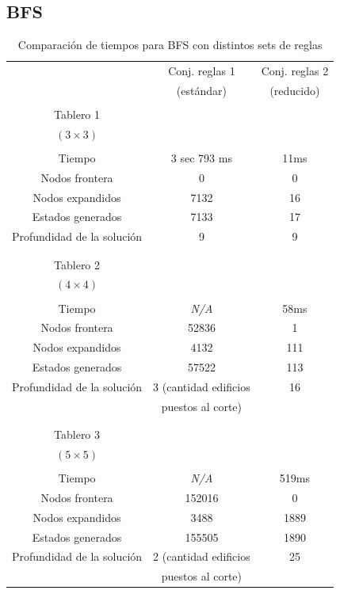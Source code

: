 \documentclass[%
    final,
    reprint,
    notitlepage,
    narroweqnarray,
    inline,
    twoside,
    invited
    ]{ieee}
\begin{document}
\clearpage

\subsection{BFS}

\begin{table}[H]
\begin{center}
\begin{tabular}{|c|c|c|}
\hline
 & Conj. reglas 1 &  Conj. reglas 2\\
 & (estándar) &  (reducido)\\

\hline
\hline

&&\\
Tablero 1 & & \\
$(3\times 3)$ & & \\
&&\\
\hline
Tiempo & 3 sec 793 ms & 11ms \\
\hline
Nodos frontera & 0 & 0 \\
\hline
Nodos expandidos & 7132 & 16 \\
\hline
Estados generados & 7133  & 17 \\
\hline
Profundidad de la solución & 9 & 9 \\
\hline
&&\\

\hline
\hline

&&\\
Tablero 2 & & \\
$(4\times 4)$ & & \\
&&\\
\hline
Tiempo & \textit{N/A} & 58ms \\
\hline
Nodos frontera & 52836 & 1 \\
\hline
Nodos expandidos & 4132 & 111 \\
\hline
Estados generados & 57522 & 113 \\
\hline
Profundidad de la solución & 3 (cantidad edificios  & 16 \\
&puestos al corte)&\\
\hline
&&\\

\hline
\hline

&&\\
Tablero 3 & & \\
$(5\times 5)$ & & \\
&&\\
\hline
Tiempo & \textit{N/A} & 519ms \\
\hline
Nodos frontera & 152016 & 0 \\
\hline
Nodos expandidos & 3488 & 1889 \\
\hline
Estados generados & 155505 & 1890 \\
\hline
Profundidad de la solución & 2 (cantidad edificios  & 25 \\
&puestos al corte)&\\

\hline  
\end{tabular}
\end{center}
\caption{Comparación de tiempos para BFS con distintos sets de reglas}\
\end{table}
\end{document}
